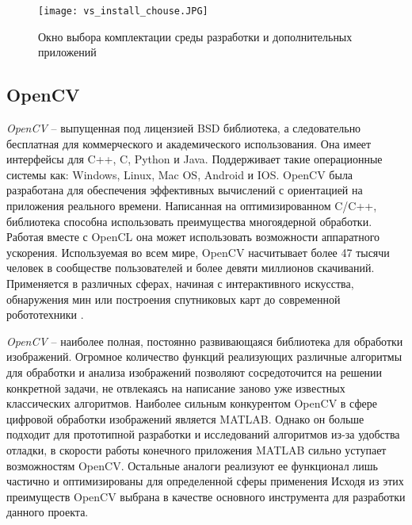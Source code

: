 \begin{figure}
    \centering   
    \texttt{[image: vs\_install\_chouse.JPG]} 
    \caption{Окно выбора комплектации среды разработки и дополнительных приложений }
    \label{fig:vs_install_chouse}
\end{figure} 

\begin{comment}
\begin{figure}
    \centering   
    \texttt{[image: vs\_install2.JPG]} 
    \caption{Процесс скачивания и установки Visual Studio}
    \label{fig:vs_install_progress}
\end{figure} 
\end{comment}
\subsection{OpenCV}
\label{sub:env_description:opencv}
\textit{OpenCV} -- выпущенная под лицензией BSD библиотека, а следовательно бесплатная для коммерческого и академического использования. Она имеет интерфейсы для C++, C, Python и Java. Поддерживает такие операционные системы как: Windows, Linux, Mac OS, Android и IOS. OpenCV была разработана для обеспечения эффективных вычислений с ориентацией на приложения реального времени. Написанная на оптимизированном C/C++, библиотека способна использовать преимущества многоядерной обработки. Работая вместе с OpenCL она может использовать возможности аппаратного ускорения. Используемая во всем мире, OpenCV насчитывает более 47 тысячи человек в сообществе пользователей и более девяти миллионов скачиваний. Применяется в различных сферах, начиная с интерактивного искусства, обнаружения мин или построения спутниковых карт до современной робототехники \cite{opencv_offical}.

\textit{OpenCV} -- наиболее полная, постоянно развивающаяся библиотека для обработки изображений. Огромное количество функций реализующих различные алгоритмы для обработки и анализа изображений позволяют сосредоточится на решении конкретной задачи, не отвлекаясь на написание заново уже известных классических алгоритмов. Наиболее сильным конкурентом OpenCV в сфере цифровой обработки изображений является MATLAB. Однако он больше подходит для прототипной разработки и исследований алгоритмов из-за удобства отладки, в скорости работы конечного приложения MATLAB сильно уступает возможностям OpenCV. Остальные аналоги реализуют ее функционал лишь частично и оптимизированы для определенной сферы применения Исходя из этих преимуществ OpenCV выбрана в качестве основного инструмента для разработки данного проекта. 

